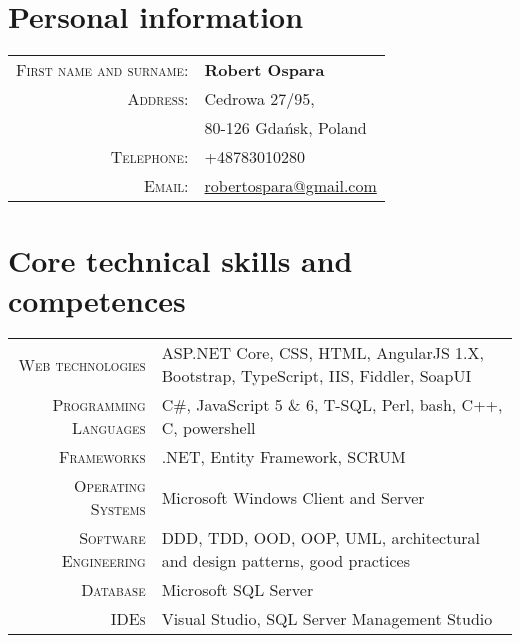 \documentclass[a4paper,12pt]{article}
\begin{document}
\mbox{}
\par{\bigskip\par}

\section{Personal information}

\begin{tabular}{rl}
	\textsc{First name and surname:}&  \textbf{Robert Ospara} \\
	\textsc{Address:}& Cedrowa 27/95, \\
	\textsc{}& 80-126 Gdańsk, Poland \\
	\textsc{Telephone:}& +48783010280 \\
	\textsc{Email:}& \href{mailto:robertospara@gmail.com}{robertospara@gmail.com}
\end{tabular}

\vspace{2em}

\section{Core technical skills and competences}
\begin{tabular}{r|p{9.5cm}}
	\textsc{Web technologies}
	&\footnotesize{ASP.NET Core, CSS, HTML, AngularJS 1.X, Bootstrap, TypeScript, IIS, Fiddler, SoapUI} \\
	\textsc{Programming Languages}
	&\footnotesize{C\#, JavaScript 5 \& 6, T-SQL, Perl, bash, C++, C, powershell} \\
	\textsc{Frameworks}
	&\footnotesize{.NET, Entity Framework, SCRUM} \\
	\textsc{Operating Systems}
	&\footnotesize{Microsoft Windows Client and Server} \\
	\textsc{Software Engineering}
	&\footnotesize{DDD, TDD, OOD, OOP, UML, architectural and design patterns, good practices} \\
	\textsc{Database}
	&\footnotesize{Microsoft SQL Server} \\
	\textsc{IDEs}
	&\footnotesize{Visual Studio, SQL Server Management Studio} \\
\end{tabular}
\end{document}
